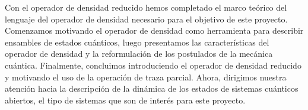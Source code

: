 Con el operador de densidad reducido hemos completado
el marco teórico del lenguaje del operador de densidad necesario
para el objetivo de este proyecto. Comenzamos
motivando el operador de densidad como herramienta 
para describir ensambles de
estados cuánticos, luego presentamos las características
del operador de densidad y la reformulación de los postulados 
de la mecánica cuántica.
Finalmente, concluimos introduciendo el operador de densidad reducido y
motivando el uso de la operación de traza parcial. Ahora, dirigimos
nuestra atención hacia la descripción de la dinámica de los estados
de sistemas cuánticos abiertos, el tipo de sistemas que son de interés
para este proyecto.


%
